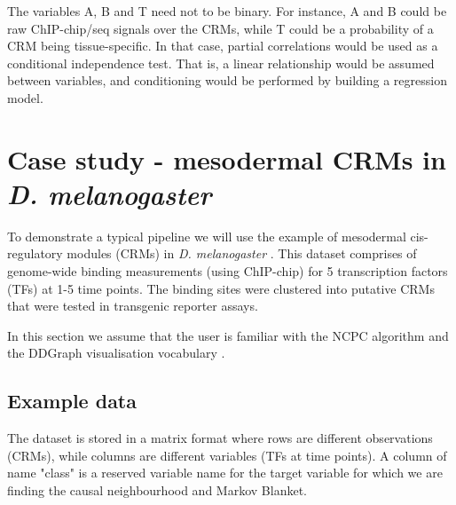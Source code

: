 \documentclass{article}
\begin{document}
The variables A, B and T need not to be binary. For instance, A and B could be raw ChIP-chip/seq signals over the CRMs, while T could be a probability of a CRM being tissue-specific. In that case, partial correlations would be used as a conditional independence test. That is, a linear relationship would be assumed between variables, and conditioning would be performed by building a regression model. 

\section{Case study - mesodermal CRMs in \textit{D. melanogaster}}\label{sec:case}

To demonstrate a typical pipeline we will use the example of mesodermal cis-regulatory modules (CRMs) in \textit{D. melanogaster} \citep{zinzen_combinatorial_2009}. This dataset comprises of genome-wide binding measurements (using ChIP-chip) for 5 transcription factors (TFs) at 1-5 time points. The binding sites were clustered into putative CRMs that were tested in transgenic reporter assays. 

In this section we assume that the user is familiar with the NCPC algorithm and the DDGraph visualisation vocabulary \citep{stojnic_2012}. 

\subsection{Example data}

The dataset is stored in a matrix format where rows are different observations (CRMs), while columns are different variables (TFs at time points). A column of name "class" is a reserved variable name for the target variable for which we are finding the causal neighbourhood and Markov Blanket. 
\end{document}
